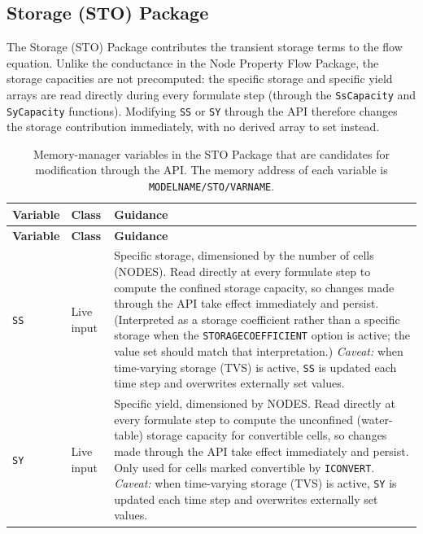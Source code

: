 \subsection{Storage (STO) Package}

The Storage (STO) Package contributes the transient storage terms to the flow
equation. Unlike the conductance in the Node Property Flow Package, the storage
capacities are not precomputed: the specific storage and specific yield arrays
are read directly during every formulate step (through the \texttt{SsCapacity}
and \texttt{SyCapacity} functions). Modifying \texttt{SS} or \texttt{SY} through
the API therefore changes the storage contribution immediately, with no derived
array to set instead.

\begin{longtable}{p{} p{} p{}}
\caption{Memory-manager variables in the STO Package that are candidates for
modification through the API. The memory address of each variable is
\texttt{MODELNAME/STO/VARNAME}.} \label{table:api-gwf-sto} \\

\hline
\textbf{Variable} & \textbf{Class} & \textbf{Guidance} \\
\hline
\endfirsthead

\hline
\textbf{Variable} & \textbf{Class} & \textbf{Guidance} \\
\hline
\endhead

\texttt{SS} & Live input &
Specific storage, dimensioned by the number of cells (NODES). Read directly at
every formulate step to compute the confined storage capacity, so changes made
through the API take effect immediately and persist. (Interpreted as a storage
coefficient rather than a specific storage when the \texttt{STORAGECOEFFICIENT}
option is active; the value set should match that interpretation.)
\emph{Caveat:} when time-varying storage (TVS) is active, \texttt{SS} is updated
each time step and overwrites externally set values. \\

\texttt{SY} & Live input &
Specific yield, dimensioned by NODES. Read directly at every formulate step to
compute the unconfined (water-table) storage capacity for convertible cells, so
changes made through the API take effect immediately and persist. Only used for
cells marked convertible by \texttt{ICONVERT}. \emph{Caveat:} when time-varying
storage (TVS) is active, \texttt{SY} is updated each time step and overwrites
externally set values. \\


\end{longtable}
